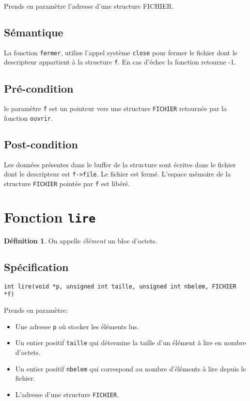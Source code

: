 \documentclass[11pt]{article}
\theoremstyle{definition}
\newtheorem*{mydef}{Définition}
\theoremstyle{definition}
\begin{document}
  Prends en paramètre l'adresse d'une structure FICHIER.

  \subsection{Sémantique}
  La fonction \texttt{fermer}, utilise l'appel système \texttt{close} pour fermer le fichier dont le descripteur appartient à la structure \texttt{f}. En cas d'échec la fonction retourne -1.
  \subsection{Pré-condition}
  le paramètre \texttt{f} est un pointeur vers une structure \texttt{FICHIER}
  retournée par la fonction \texttt{ouvrir}.
  \subsection{Post-condition}
  Les données présentes dans le buffer de la structure sont écrites dans le fichier
  dont le descripteur est \texttt{f->file}.
  Le fichier est fermé.
  L'espace mémoire de la structure \texttt{FICHIER} pointée par \texttt{f}
  est libéré.





\section{Fonction \texttt{lire}}

\begin{mydef} On appelle \textit{élément} un bloc d'octets.
\end{mydef}

\subsection{Spécification}
\texttt{int lire(void *p, unsigned int taille, unsigned int nbelem, FICHIER *f)}

Prends en paramètre:
\begin{itemize}
\item Une adresse \texttt{p} où stocker les éléments lus.
\item Un entier positif \texttt{taille} qui détermine la taille d'un élément à lire
  en nombre d'octets.
\item Un entier positif \texttt{nbelem} qui correspond au nombre d'éléments à lire depuis
  le fichier.
\item L'adresse d'une structure \texttt{FICHIER}.
\end{itemize}
\end{document}
